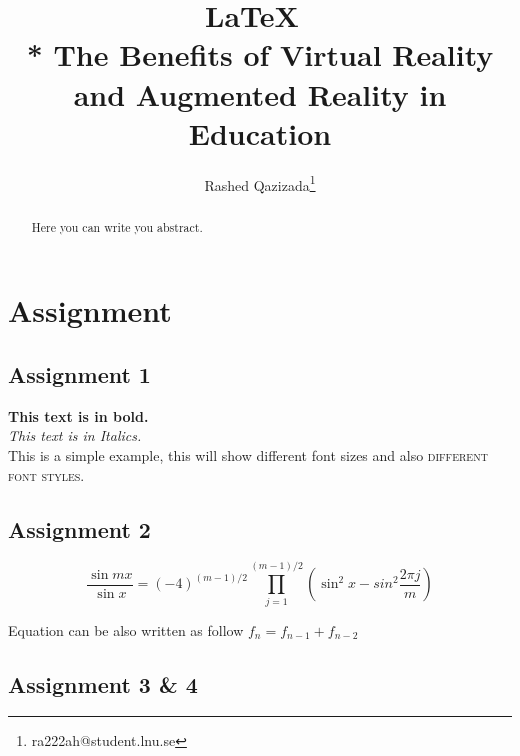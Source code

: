 \documentclass{article}
\begin{document}
\title{\textbf{\LaTeX\  \\*
The Benefits of Virtual Reality and Augmented Reality in Education }}
\author{Rashed Qazizada\thanks{ra222ah@student.lnu.se}}

\maketitle
\newpage
\begin{abstract}
    Here you can write you abstract.
    
\end{abstract}


 \newpage
{}
\tableofcontents

\newpage
 


\section{Assignment}


\subsection{Assignment 1}

\textbf{This text is in bold.}\\
\textit{This text is in Italics.}\\
This is a simple example, {\tiny this will show different font sizes} and also \textsc{different font styles}.
\subsection{Assignment 2}

\begin{equation*}
    \frac{\sin mx}{\sin x}=(-4)^{(m-1)/2} \prod_{j=1}^{(m-1)/2} 
    \left( \sin^2x - sin^2\frac{2\pi j}{m} \right)
    \end{equation*}

Equation can be also written as follow $f_n = f_{n-1} + f_{n-2} $


\subsection{Assignment 3 \& 4}

\end{document}
